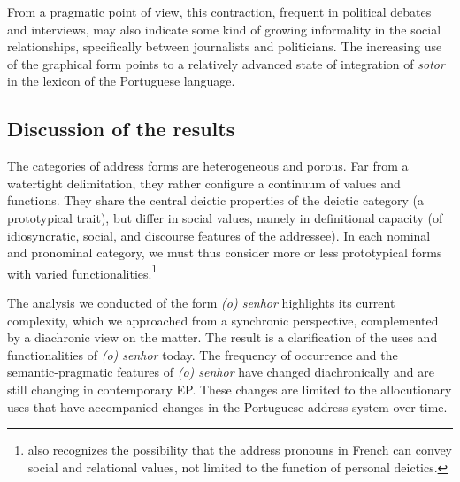 \documentclass[output=paper]{langscibook}
\begin{document}
From a pragmatic point of view, this contraction, frequent in political debates and interviews, may also indicate some kind of growing informality in the social relationships, specifically between journalists and politicians. The increasing use of the graphical form points to a relatively advanced state of integration of \textit{sotor} in the lexicon of the Portuguese language. 


\subsection{Discussion of the results}\label{sec:marques:4.5}

The categories of address forms are heterogeneous and porous. Far from a watertight delimitation, they rather configure a continuum of values and functions. They share the central deictic properties of the deictic category (a prototypical trait), but differ in social values, namely in definitional capacity (of idiosyncratic, social, and discourse features of the addressee). In each nominal and pronominal category, we must thus consider more or less prototypical forms with varied functionalities.\footnote{\citet{Kerbrat-Orecchioni2014} also recognizes the possibility that the address pronouns in French can convey social and relational values, not limited to the function of personal deictics.}



The analysis we conducted of the form \textit{(o) senhor} highlights its current complexity, which we approached from a synchronic perspective, complemented by a diachronic view on the matter. The result is a clarification of the uses and functionalities of \textit{(o) senhor} today. The frequency of occurrence and the semantic-pragmatic features of \textit{(o) senhor} have changed diachronically and are still changing in contemporary EP. These changes are limited to the allocutionary uses that have accompanied changes in the Portuguese address system over time.
\end{document}
